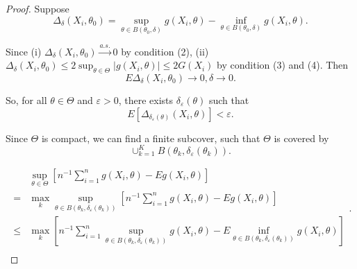 \begin{proof}
	Suppose
	\begin{equation*}
		\Delta_{\delta}\left(X_{i},\theta_{0}\right)=\sup_{\theta\in B\left(\theta_{0},\delta\right)}g\left(X_{i},\theta\right)-\inf_{\theta\in B\left(\theta_{0},\delta\right)}g\left(X_{i},\theta\right).
	\end{equation*}

	Since (i) \(\Delta_{\delta}\left(X_{i},\theta_{0}\right)\stackrel{a.s.}{\rightarrow} 0\) by condition (2), (ii) \(\Delta_{\delta}\left(X_{i},\theta_{0}\right) \leq 2\sup_{\theta\in\Theta}\left|g\left(X_{i},\theta\right)\right|\leq 2G\left(X_{i}\right)\) by condition (3) and (4). Then
	\begin{equation*}
		E\Delta_{\delta}\left(X_{i},\theta_{0}\right)\rightarrow 0,\delta\rightarrow 0.
	\end{equation*}

	So, for all \(\theta\in\Theta\) and \(\varepsilon>0\), there exists \(\delta_{\varepsilon}(\theta)\) such that
	\begin{equation*}
		E\left[\Delta_{\delta_{\varepsilon}(\theta)}\left(X_{i},\theta\right)\right]<\varepsilon.
	\end{equation*}

	Since \(\Theta\) is compact, we can find a finite subcover, such that \(\Theta\) is covered by
	\begin{equation*}
		\cup_{k=1}^{K}B\left(\theta_{k}, \delta_{\varepsilon}\left(\theta_{k}\right)\right).
	\end{equation*}

	\begin{equation*}
		\begin{aligned}
			     & \sup_{\theta\in\Theta}\left[n^{-1}\sum_{i=1}^{n}g\left(X_{i},\theta\right)-Eg\left(X_{i},\theta\right)\right]                                                                                                                                                             \\
			=    & \max_{k}\sup_{\theta\in B\left(\theta_{k},\delta_{\varepsilon}\left(\theta_{k}\right)\right)}\left[n^{-1}\sum_{i=1}^{n}g\left(X_{i},\theta\right)-Eg\left(X_{i},\theta\right)\right]                                                                                      \\
			\leq & \max_{k}\left[n^{-1}\sum_{i=1}^{n}\sup_{\theta\in B\left(\theta_{k},\delta_{\varepsilon}\left(\theta_{k}\right)\right)}g\left(X_{i},\theta\right)-E\inf_{\theta\in B\left(\theta_{k},\delta_{\varepsilon}\left(\theta_{k}\right)\right)}g\left(X_{i},\theta\right)\right] \\
		\end{aligned}.
	\end{equation*}


\end{proof}
